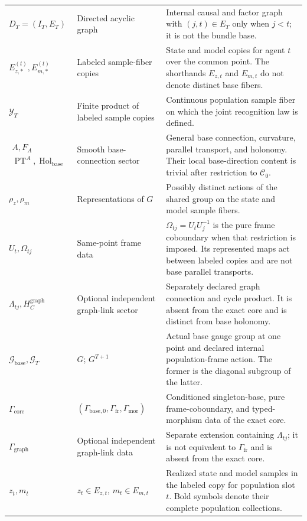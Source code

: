 {\begin{longtable}{>{\raggedright\arraybackslash}p{} >{\raggedright\arraybackslash}p{} >{\raggedright\arraybackslash}p{}}
$D_T=(I_T,E_T)$ & Directed acyclic graph & Internal causal and factor graph with $(j,t)\in E_T$ only when $j<t$; it is not the bundle base. \\
\addlinespace
$E_{z,\ast}^{(t)},E_{m,\ast}^{(t)}$ & Labeled sample-fiber copies & State and model copies for agent $t$ over the common point. The shorthands $E_{z,t}$ and $E_{m,t}$ do not denote distinct base fibers. \\
\addlinespace
$\mathcal Y_T$ & Finite product of labeled sample copies & Continuous population sample fiber on which the joint recognition law is defined. \\
\addlinespace
$\begin{gathered}A,F_A\\\operatorname{PT}^A,\operatorname{Hol}_{\mathrm{base}}\end{gathered}$ & Smooth base-connection sector & General base connection, curvature, parallel transport, and holonomy. Their local base-direction content is trivial after restriction to $\mathcal C_0$. \\
\addlinespace
$\rho_z,\rho_m$ & Representations of $G$ & Possibly distinct actions of the shared group on the state and model sample fibers. \\
\addlinespace
$U_t,\Omega_{tj}$ & Same-point frame data & $\Omega_{tj}=U_tU_j^{-1}$ is the pure frame coboundary when that restriction is imposed. Its represented maps act between labeled copies and are not base parallel transports. \\
\addlinespace
$\Lambda_{tj},H_C^{\mathrm{graph}}$ & Optional independent graph-link sector & Separately declared graph connection and cycle product. It is absent from the exact core and is distinct from base holonomy. \\
\addlinespace
$\mathcal G_{\mathrm{base}},\mathcal G_T$ & $G$; $G^{T+1}$ & Actual base gauge group at one point and declared internal population-frame action. The former is the diagonal subgroup of the latter. \\
\addlinespace
$\Gamma_{\mathrm{core}}$ & $(\Gamma_{\mathrm{base},0},\Gamma_{\mathrm{fr}},\Gamma_{\mathrm{mor}})$ & Conditioned singleton-base, pure frame-coboundary, and typed-morphism data of the exact core. \\
\addlinespace
$\Gamma_{\mathrm{graph}}$ & Optional independent graph-link data & Separate extension containing $\Lambda_{tj}$; it is not equivalent to $\Gamma_{\mathrm{fr}}$ and is absent from the exact core. \\
\addlinespace
$z_t,m_t$ & $z_t\in E_{z,t}$, $m_t\in E_{m,t}$ & Realized state and model samples in the labeled copy for population slot $t$. Bold symbols denote their complete population collections. \\

\end{longtable}}
